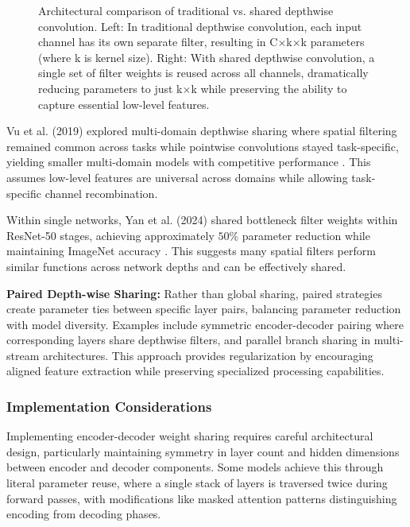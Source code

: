 \documentclass[12pt,a4paper]{article}
\begin{document}
\begin{figure}[H]
\caption{Architectural comparison of traditional vs. shared depthwise convolution. Left: In traditional depthwise convolution, each input channel has its own separate filter, resulting in C×k×k parameters (where k is kernel size). Right: With shared depthwise convolution, a single set of filter weights is reused across all channels, dramatically reducing parameters to just k×k while preserving the ability to capture essential low-level features.}
\label{fig:depthwise_sharing}
\end{figure}

Vu et al. (2019) explored multi-domain depthwise sharing where spatial filtering remained common across tasks while pointwise convolutions stayed task-specific, yielding smaller multi-domain models with competitive performance \cite{vu2019}. This assumes low-level features are universal across domains while allowing task-specific channel recombination.

Within single networks, Yan et al. (2024) shared bottleneck filter weights within ResNet-50 stages, achieving approximately $50\%$ parameter reduction while maintaining ImageNet accuracy \cite{yan2024}. This suggests many spatial filters perform similar functions across network depths and can be effectively shared.

\textbf{Paired Depth-wise Sharing:} Rather than global sharing, paired strategies create parameter ties between specific layer pairs, balancing parameter reduction with model diversity. Examples include symmetric encoder-decoder pairing where corresponding layers share depthwise filters, and parallel branch sharing in multi-stream architectures. This approach provides regularization by encouraging aligned feature extraction while preserving specialized processing capabilities.

\subsubsection{Implementation Considerations}

Implementing encoder-decoder weight sharing requires careful architectural design, particularly maintaining symmetry in layer count and hidden dimensions between encoder and decoder components. Some models achieve this through literal parameter reuse, where a single stack of layers is traversed twice during forward passes, with modifications like masked attention patterns distinguishing encoding from decoding phases.
\end{document}
